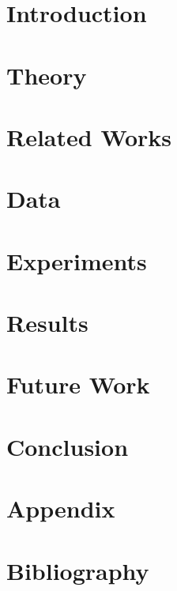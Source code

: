 \documentclass[a4paper]{article}
\begin{document}
\newpage

\section{Introduction}


\section{Theory}






\section{Related Works}


\section{Data}





\section{Experiments}




\section{Results} \label{sec:results}


\section{Future Work}


\section{Conclusion}


\newpage

\section*{Appendix}






\newpage

\section*{Bibliography}
\printbibliography
\end{document}
